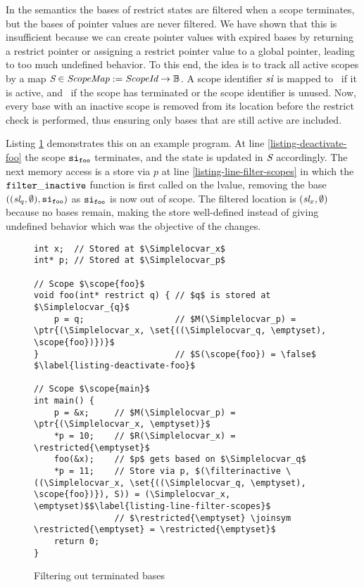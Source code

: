 In the \cink{} semantics the bases of restrict states are filtered when a scope terminates,
but the bases of pointer values are never filtered.
We have shown that this is insufficient because we can create pointer values with expired bases by returning a restrict pointer or assigning a restrict pointer value to a global pointer,
leading to too much undefined behavior.
To this end, the idea is to track all active scopes by a map $\textit{S} \in \textit{ScopeMap} := \textit{ScopeId} \to \mathbb{B}$.
A scope identifier $\textit{si}$ is mapped to \true \ if it is active, and \false \ if the scope has terminated or the scope identifier is unused.
Now, every base with an inactive scope is removed from its location before the restrict check is performed,
thus ensuring only bases that are still active are included.

Listing \ref{listing:scopemap} demonstrates this on an example program.
At line \ref{listing-deactivate-foo} the scope $\mathtt{si}_\mathtt{foo}$ terminates, and the state is updated in $\textit{S}$ accordingly.
The next memory access is a store via $p$ at line \ref{listing-line-filter-scopes} in which the $\mathtt{filter\_inactive}$ function is first called
on the lvalue, removing the base $((\textit{sl}_q, \emptyset), \mathtt{si}_\mathtt{foo})$ as $\mathtt{si}_\mathtt{foo}$ is now out of scope.
The filtered location is $(\textit{sl}_x, \emptyset)$ because no bases remain, making the store well-defined instead of giving undefined behavior
which was the objective of the changes.

\begin{figure}[H]
\begin{verbatim}
int x;  // Stored at $\Simplelocvar_x$
int* p; // Stored at $\Simplelocvar_p$

// Scope $\scope{foo}$
void foo(int* restrict q) { // $q$ is stored at $\Simplelocvar_{q}$
    p = q;                  // $M(\Simplelocvar_p) = \ptr{(\Simplelocvar_x, \set{((\Simplelocvar_q, \emptyset), \scope{foo})})}$
}                           // $S(\scope{foo}) = \false$ $\label{listing-deactivate-foo}$

// Scope $\scope{main}$
int main() {
    p = &x;     // $M(\Simplelocvar_p) = \ptr{(\Simplelocvar_x, \emptyset)}$
    *p = 10;    // $R(\Simplelocvar_x) = \restricted{\emptyset}$
    foo(&x);    // $p$ gets based on $\Simplelocvar_q$
    *p = 11;    // Store via p, $(\filterinactive \ ((\Simplelocvar_x, \set{((\Simplelocvar_q, \emptyset), \scope{foo})}), S)) = (\Simplelocvar_x, \emptyset)$$\label{listing-line-filter-scopes}$
                // $\restricted{\emptyset} \joinsym \restricted{\emptyset} = \restricted{\emptyset}$
    return 0;
}
\end{verbatim}
\vspace*{-0.4cm}
\caption{Filtering out terminated bases}
\label{listing:scopemap}
\end{figure}


